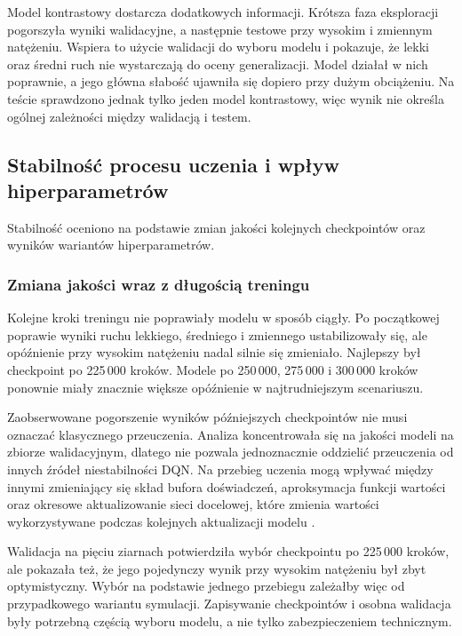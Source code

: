 Model kontrastowy dostarcza dodatkowych informacji. Krótsza faza eksploracji pogorszyła wyniki walidacyjne, a następnie testowe przy wysokim i zmiennym natężeniu. Wspiera to użycie walidacji do wyboru modelu i pokazuje, że lekki oraz średni ruch nie wystarczają do oceny generalizacji. Model działał w nich poprawnie, a jego główna słabość ujawniła się dopiero przy dużym obciążeniu. Na teście sprawdzono jednak tylko jeden model kontrastowy, więc wynik nie określa ogólnej zależności między walidacją i testem.

\subsection{Stabilność procesu uczenia i wpływ hiperparametrów}
\label{subsec:analiza-stabilnosci}

Stabilność oceniono na podstawie zmian jakości kolejnych checkpointów oraz wyników wariantów hiperparametrów.

\subsubsection{Zmiana jakości wraz z długością treningu}

Kolejne kroki treningu nie poprawiały modelu w sposób ciągły. Po początkowej poprawie wyniki ruchu lekkiego, średniego i zmiennego ustabilizowały się, ale opóźnienie przy wysokim natężeniu nadal silnie się zmieniało. Najlepszy był checkpoint po 225\,000 kroków. Modele po 250\,000, 275\,000 i 300\,000 kroków ponownie miały znacznie większe opóźnienie w najtrudniejszym scenariuszu.

Zaobserwowane pogorszenie wyników późniejszych checkpointów nie musi oznaczać klasycznego przeuczenia. Analiza koncentrowała się na jakości modeli na zbiorze walidacyjnym, dlatego nie pozwala jednoznacznie oddzielić przeuczenia od innych źródeł niestabilności DQN. Na przebieg uczenia mogą wpływać między innymi zmieniający się skład bufora doświadczeń, aproksymacja funkcji wartości oraz okresowe aktualizowanie sieci docelowej, które zmienia wartości wykorzystywane podczas kolejnych aktualizacji modelu \cite{mnih2013playing}.

Walidacja na pięciu ziarnach potwierdziła wybór checkpointu po 225\,000 kroków, ale pokazała też, że jego pojedynczy wynik przy wysokim natężeniu był zbyt optymistyczny. Wybór na podstawie jednego przebiegu zależałby więc od przypadkowego wariantu symulacji. Zapisywanie checkpointów i osobna walidacja były potrzebną częścią wyboru modelu, a nie tylko zabezpieczeniem technicznym.

